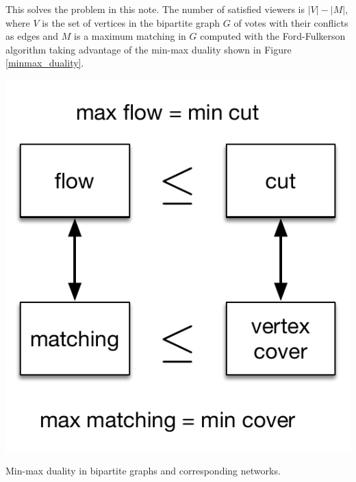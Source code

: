 This solves the problem in this note. The number of satisfied viewers is $|V| - |M|$, where $V$ is the set of vertices in the bipartite graph $G$ of votes with their conflicts as edges and $M$ is a maximum matching in $G$ computed with the Ford-Fulkerson algorithm taking advantage of the min-max duality shown in Figure \ref{minmax_duality}.

\begin{marginfigure}
    \includegraphics[scale=0.5]{flowcutminmax.pdf}
    \caption{Min-max duality in bipartite graphs and corresponding networks.}
	\label{minmax_duality}
\end{marginfigure}{}






